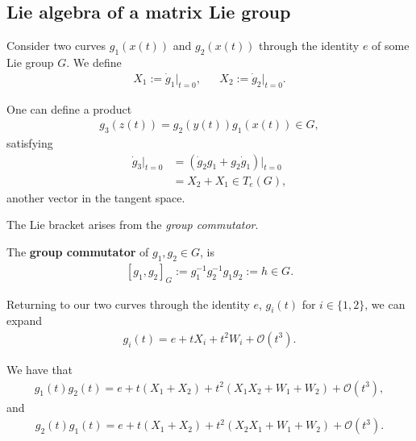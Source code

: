 \subsection{Lie algebra of a matrix Lie group}

Consider two curves $g_1 \left( x \left( t \right)  \right)$ and $g_2 \left( x \left( t \right)  \right)$ through the identity $e$ of some Lie group $G$. We define
\begin{align}
    X_1 := \dot{g}_1 \bigg|_{t=0}, &&  X_2 := \dot{g}_2 \bigg|_{t=0}
.\end{align}

One can define a product
\begin{align}
    g_3 \left( z\left( t \right)  \right) = g_2\left( y\left( t \right)  \right) g_1 \left( x \left( t \right)  \right) \in G
,\end{align}
satisfying
\begin{align}
    \dot{g}_3 \bigg|_{t=0} &= \left( \dot{g}_2 g_1 + g_2 \dot{g}_1 \right) \bigg|_{t=0}  \\
    &= X_2 + X_1 \in T_e \left( G \right)
,\end{align}
another vector in the tangent space.

The Lie bracket arises from the \textit{group commutator}.

\begin{definition}
    The \textbf{group commutator} of $g_1, g_2 \in G$, is
    \begin{align}
        \left[ g_1, g_2 \right]_{G} := g^{-1}_1 g_2^{-1} g_1 g_2 := h \in G
    .\end{align}
\end{definition}

Returning to our two curves through the identity $e$, $g_i \left( t \right) $ for $i \in \{1,2\} $, we can expand
\begin{align}
    g_i \left( t \right) = e + t X_i + t^2 W_i + \mathcal{O}\left( t^3 \right) 
.\end{align}

We have that
\begin{align}
    g_1 \left( t \right) g_2 \left( t \right) = e + t \left( X_1 + X_2 \right) + t^2 \left( X_1 X_2 + W_1 + W_2 \right) + \mathcal{O}\left( t^3 \right) 
,\end{align}
and
\begin{align}
    g_2 \left( t \right) g_1 \left( t \right) = e + t \left( X_1 + X_2 \right) + t^2 \left( X_2 X_1 + W_1 + W_2 \right) + \mathcal{O}\left( t^3 \right) 
.\end{align}

